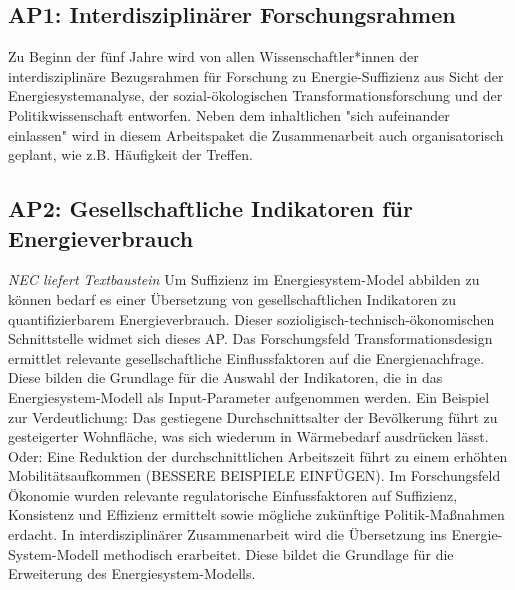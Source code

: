 \documentclass[a4paper,11pt,twoside]{scrartcl}
\begin{document}
\subsection*{AP1: Interdisziplinärer Forschungsrahmen}
Zu Beginn der fünf Jahre wird von allen Wissenschaftler*innen der interdisziplinäre Bezugsrahmen für Forschung zu Energie-Suffizienz aus Sicht der Energiesystemanalyse, der sozial-ökologischen Transformationsforschung und der Politikwissenschaft entworfen. Neben dem inhaltlichen "sich aufeinander einlassen" wird in diesem Arbeitspaket die Zusammenarbeit auch organisatorisch geplant, wie z.B. Häufigkeit der Treffen.

\subsection*{AP2: Gesellschaftliche Indikatoren für Energieverbrauch}
\textit{NEC liefert Textbaustein}
Um Suffizienz im Energiesystem-Model abbilden zu können bedarf es einer Übersetzung von gesellschaftlichen Indikatoren zu quantifizierbarem Energieverbrauch. Dieser sozioligisch-technisch-ökonomischen Schnittstelle widmet sich dieses AP. Das Forschungsfeld Transformationsdesign ermittlet relevante gesellschaftliche Einflussfaktoren auf die Energienachfrage. Diese bilden die Grundlage für die Auswahl der Indikatoren, die in das Energiesystem-Modell als Input-Parameter aufgenommen werden. Ein Beispiel zur Verdeutlichung: Das gestiegene Durchschnittsalter der Bevölkerung führt zu gesteigerter Wohnfläche, was sich wiederum in Wärmebedarf ausdrücken lässt. Oder: Eine Reduktion der durchschnittlichen Arbeitszeit führt zu einem erhöhten Mobilitätsaufkommen (BESSERE BEISPIELE EINFÜGEN). Im Forschungsfeld Ökonomie wurden relevante regulatorische Einfussfaktoren auf Suffizienz, Konsistenz und Effizienz ermittelt sowie mögliche zukünftige Politik-Maßnahmen erdacht. In interdisziplinärer Zusammenarbeit wird die Übersetzung ins Energie-System-Modell methodisch erarbeitet. Diese bildet die Grundlage für die Erweiterung des Energiesystem-Modells.
\end{document}
